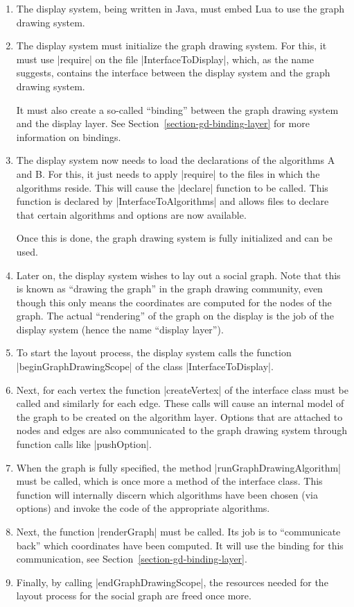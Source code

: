 \begin{enumerate}
\item The display system, being written in Java, must embed Lua to use the
  graph drawing system.
\item The display system must initialize the graph drawing system. For this,
  it must use |require| on the file |InterfaceToDisplay|, which, as
  the name suggests, contains the interface between the display
  system and the graph drawing system.
  
  It must also create a so-called ``binding'' between the
  graph drawing system and the display layer. See
  Section~\ref{section-gd-binding-layer} for more information on
  bindings.
\item The display system now needs to load the declarations of the
  algorithms A and B. For this, it just needs to apply |require| to
  the files in which the algorithms reside. This will cause the
  |declare| function to be called. This function is declared by
  |InterfaceToAlgorithms| and allows files to declare that certain
  algorithms and options are now available.

  Once this is done, the graph drawing system is fully initialized and
  can be used.
\item Later on, the display system wishes to lay out a social graph. Note
  that this is known as ``drawing the graph'' in the graph drawing
  community, even though this only means the coordinates are computed
  for the nodes of the graph. The actual ``rendering'' of the graph on
  the display is the job of the display system (hence the name ``display
  layer'').
\item To start the layout process, the display system calls the function
  |beginGraphDrawingScope| of the class |InterfaceToDisplay|.
\item Next, for each vertex the function |createVertex| of the
  interface class must be called and similarly for each edge. These
  calls will cause an internal model of the graph to be created on the
  algorithm layer. Options that are attached to nodes and edges are
  also communicated to the graph drawing system through function calls
  like |pushOption|.
\item When the graph is fully specified, the method
  |runGraphDrawingAlgorithm| must be called, which is once more a
  method of the interface class. This function will internally discern
  which algorithms have been chosen (via options) and invoke the code
  of the appropriate algorithms.
\item Next, the function |renderGraph| must be called. Its job is to
  ``communicate back'' which coordinates have been computed. It will
  use the binding for this communication, see
  Section~\ref{section-gd-binding-layer}.
\item Finally, by calling |endGraphDrawingScope|, the resources needed
  for the layout process for the social graph are freed once more.
\end{enumerate}

